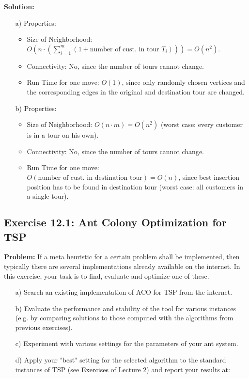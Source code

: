 \textbf{Solution:}
\begin{enumerate}
\item[a)] Properties:
  \begin{itemize}
  \item Size of Neighborhood: \(O(n \cdot (\sum_{i=1}^{m}(1 + \text{number of cust. in tour } T_i))) = O(n^2)\).
  \item Connectivity: No, since the number of tours cannot change.
  \item Run Time for one move: \(O(1)\), since only randomly chosen vertices and the corresponding edges in the original and destination tour are changed.
  \end{itemize}
\item[b)] Properties:
  \begin{itemize}
  \item Size of Neighborhood: \(O(n \cdot m) = O(n^2)\) (worst case: every customer is in a tour on his own).
  \item Connectivity: No, since the number of tours cannot change.
  \item Run Time for one move: \(O(\text{number of cust. in destination tour}) = O(n)\), since best insertion position has to be found in destination tour (worst case: all customers in a single tour).
  \end{itemize}
\end{enumerate}

\subsection{Exercise 12.1: Ant Colony Optimization for TSP}
\textbf{Problem:}
If a meta heuristic for a certain problem shall be implemented, then typically there are several implementations already available on the internet. In this exercise, your task is to find, evaluate and optimize one of these.

\begin{enumerate}
\item[a)] Search an existing implementation of ACO for TSP from the internet.
\item[b)] Evaluate the performance and stability of the tool for various instances (e.g. by comparing solutions to those computed with the algorithms from previous exercises).
\item[c)] Experiment with various settings for the parameters of your ant system.
\item[d)] Apply your "best" setting for the selected algorithm to the standard instances of TSP (see Exercises of Lecture 2) and report your results at:

\end{enumerate}

